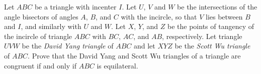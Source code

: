 Let $ABC$ be a triangle with incenter $I$. Let $U$, $V$ and $W$ be the intersections of the angle bisectors of angles $A$, $B$, and $C$ with the incircle, so that $V$ lies between $B$ and $I$, and similarly with $U$ and $W$. Let $X$, $Y$, and $Z$ be the points of tangency of the incircle of triangle $ABC$ with $BC$, $AC$, and $AB$, respectively.  Let triangle $UVW$ be the \textit{David Yang triangle} of $ABC$ and let $XYZ$ be the \textit{Scott Wu triangle} of $ABC$. Prove that the David Yang and Scott Wu triangles of a triangle are congruent if and only if $ABC$ is equilateral.

